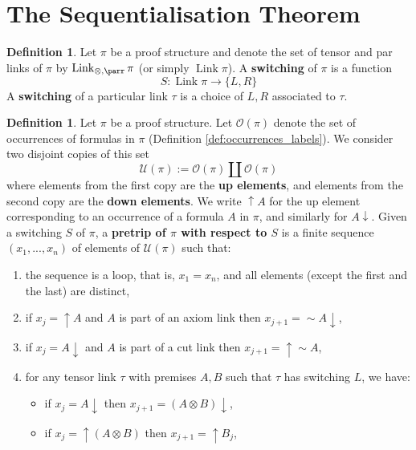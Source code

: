 \documentclass[12pt]{article}
\theoremstyle{plain}
\theoremstyle{definition}
\newtheorem{defn}[thm]{Definition} %
\newcommand{\call}[1]{\mathcal{#1}}
\newcommand{\lto}{\longrightarrow}
\newcommand{\negation}{\sim}
\begin{document}
	\section{The Sequentialisation Theorem}\label{sec:sequentialisation}
	\begin{defn}
		Let $\pi$ be a proof structure and denote the set of tensor and par links of $\pi$ by $\operatorname{Link}_{\otimes,\parr}\pi$ (or simply $\operatorname{Link}\pi$). A \textbf{switching} of $\pi$ is a function
		\begin{equation}
			S: \operatorname{Link}\pi \lto \lbrace L,R\rbrace
		\end{equation}
		A \textbf{switching} of a particular link $\tau$ is a choice of $L,R$ associated to $\tau$.
	\end{defn}
	\begin{defn}\label{def:trip}
		Let $\pi$ be a proof structure. Let $\call{O}(\pi)$ denote the set of occurrences of formulas in $\pi$ (Definition \ref{def:occurrences_labels}).   We consider two disjoint copies of this set 
		\begin{equation}
			\call{U}(\pi) := \call{O}(\pi) \coprod \call{O}(\pi)
		\end{equation}
		where elements from the first copy are the \textbf{up elements}, and elements from the second copy are the \textbf{down elements}. We write $\uparrow A$ for the up element corresponding to an occurrence of a formula $A$ in $\pi$, and similarly for $A\downarrow$. Given a switching $S$ of $\pi$, a \textbf{pretrip of $\pi$ with respect to $S$} is a finite sequence $(x_1,...,x_n)$ of elements of $\call{U}(\pi)$ such that:
		\begin{enumerate}
			\item the sequence is a loop, that is, $x_1 = x_n$, and all elements (except the first and the last) are distinct,
			\item\label{def:trip_axiom} if $x_j=\uparrow A$ and $A$ is part of an axiom link then $x_{j+1} = \negation A\downarrow$,
			\item if $x_j = A\downarrow$ and $A$ is part of a cut link then $x_{j+1} = \uparrow \negation A$,
			\item for any tensor link $\tau$ with premises $A,B$ such that $\tau$ has switching $L$, we have:
			\begin{itemize}
				\item if $x_j = A \downarrow$ then $x_{j+1} = (A \otimes B)\downarrow$,
				\item if $x_j = \uparrow (A \otimes B)$ then $x_{j+1} = \uparrow B_j$,

\end{itemize}
\end{enumerate}
\end{defn}
\end{document}

